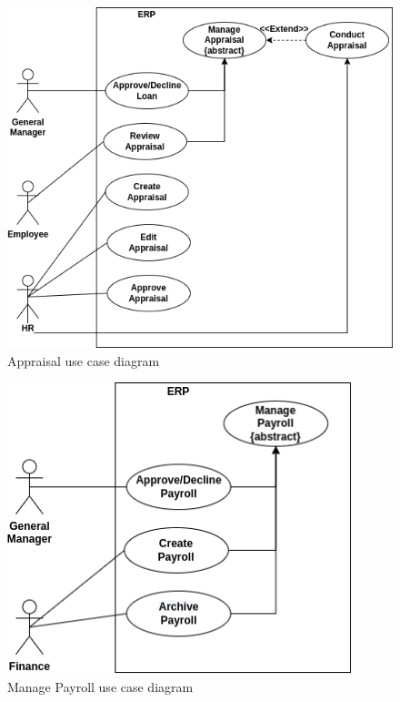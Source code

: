 \begin{figure}[!ht]
\centering
\includegraphics[width=15cm,keepaspectratio]{usecases/appraisal.drawio.png}
\caption{Appraisal use case diagram }
\end{figure}


\begin{figure}[!ht]
\centering
\includegraphics[width=10cm,keepaspectratio]{usecases/payroll.drawio.png}
\caption{Manage Payroll use case diagram }
\end{figure}



